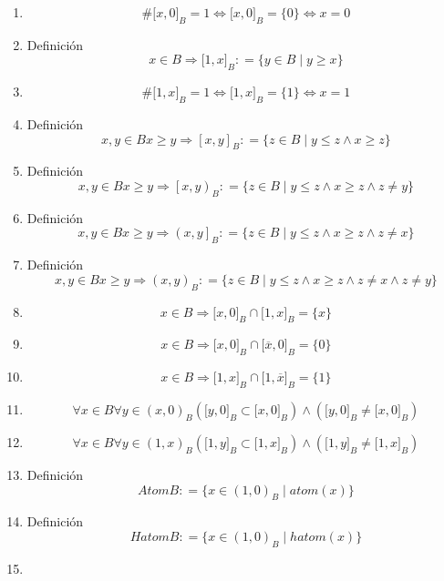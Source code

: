 \begin{enumerate}
\begin{enumerate}
\begin{enumerate}
    \item
      \[\#{{\lbrack{x,0}\rbrack}_{B} = 1}\Leftrightarrow{{\lbrack{x,0}\rbrack}_{B} = {\{ 0\}}}\Leftrightarrow{x = 0}\]
    \item
      Definición\[{x \in B}\Rightarrow{\lbrack{1,x}\rbrack}_{B}{: = {\{{{y \in B} \mid {y \geq x}}\}}}\]
    \item
      \[\#{{\lbrack{1,x}\rbrack}_{B} = 1}\Leftrightarrow{{\lbrack{1,x}\rbrack}_{B} = {\{ 1\}}}\Leftrightarrow{x = 1}\]
    \item
      Definición\[x,{y \in B}{x \geq y}\Rightarrow\left\lbrack {x,y} \right\rbrack_{B}{: = {\{{{z \in B} \mid {{y \leq {z \land x}} \geq z}}\}}}\]
    \item
      Definición\[x,{y \in B}{x \geq y}\Rightarrow\left\lbrack {x,y} \right)_{B}{: = {\{{{z \in B} \mid {{{y \leq {z \land x}} \geq {z \land z}} \neq y}}\}}}\]
    \item
      Definición\[x,{y \in B}{x \geq y}\Rightarrow\left( {x,y} \right\rbrack_{B}{: = {\{{{z \in B} \mid {{{y \leq {z \land x}} \geq {z \land z}} \neq x}}\}}}\]
    \item
      Definición\[x,{y \in B}{x \geq y}\Rightarrow\left( {x,y} \right)_{B}{: = {\{{{z \in B} \mid {{{{y \leq {z \land x}} \geq {z \land z}} \neq {x \land z}} \neq y}}\}}}\]
    \item
      \[{x \in B}\Rightarrow{{{\lbrack{x,0}\rbrack}_{B} \cap {\lbrack{1,x}\rbrack}_{B}} = {\{ x\}}}\]
    \item
      \[{x \in B}\Rightarrow{{{\lbrack{x,0}\rbrack}_{B} \cap {\lbrack{\overline{x},0}\rbrack}_{B}} = {\{ 0\}}}\]
    \item
      \[{x \in B}\Rightarrow{{{\lbrack{1,x}\rbrack}_{B} \cap {\lbrack{1,\overline{x}}\rbrack}_{B}} = {\{ 1\}}}\]
    \item
      \[\forall{x \in B}\forall{y \in \left( {x,0} \right)_{B}}{{({{\lbrack{y,0}\rbrack}_{B} \subset {\lbrack{x,0}\rbrack}_{B}})} \land {({{\lbrack{y,0}\rbrack}_{B} \neq {\lbrack{x,0}\rbrack}_{B}})}}\]
    \item
      \[\forall{x \in B}\forall{y \in \left( {1,x} \right)_{B}}{{({{\lbrack{1,y}\rbrack}_{B} \subset {\lbrack{1,x}\rbrack}_{B}})} \land {({{\lbrack{1,y}\rbrack}_{B} \neq {\lbrack{1,x}\rbrack}_{B}})}}\]
    \item
      Definición\[\mathit{Atom}B{: = {\{{{x \in (1,0)_{B}} \mid \mathit{atom}{(x)}}\}}}\]
    \item
      Definición\[\mathit{Hatom}B{: = {\{{{x \in (1,0)_{B}} \mid \mathit{hatom}{(x)}}\}}}\]
    \item

\end{enumerate}
\end{enumerate}
\end{enumerate}
